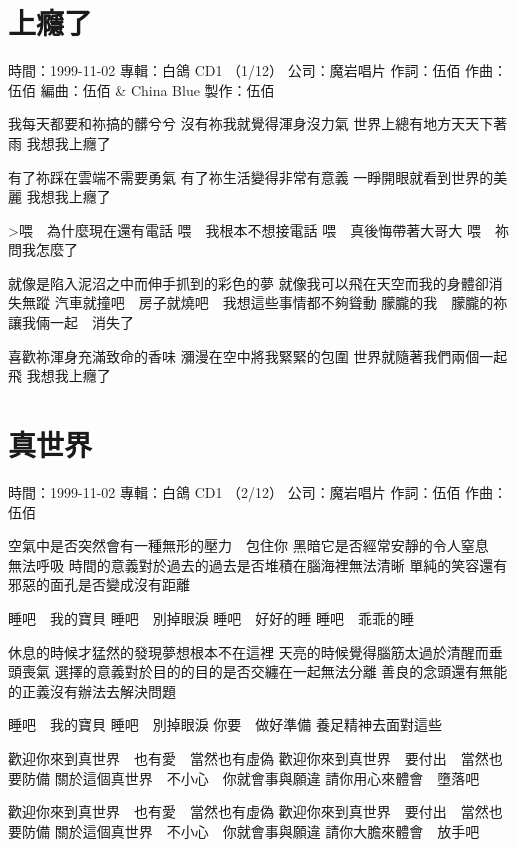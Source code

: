 \documentclass[UTF8,a4paper,oneside,twocolumn,12pt]{ctexbook}
\newcommand{\infopair}[2]{\textbullet #1：#2}
\newcommand{\zc}[1][伍佰]{\infopair{作詞}{#1}}
\newcommand{\zq}[1][伍佰]{\infopair{作曲}{#1}}
\newcommand{\bq}[1][伍佰]{\infopair{編曲}{#1}}
\newcommand{\zj}[1]{\infopair{專輯}{#1}}
\newcommand{\zz}[1]{\infopair{製作}{#1}}
\newcommand{\sj}[1]{\infopair{時間}{#1}}
\newcommand{\gs}[1]{\infopair{公司}{#1}}
\newenvironment{info}{\begin{flushleft}\kaishu
	}
	{\end{flushleft}\normalsize\yahei\par}
\newenvironment{lyric}{
	}
{}
\begin{document}
\section{上癮了}
\begin{info}
	\sj{1999-11-02}
	\zj{白鴿 CD1 （1/12）}
	\gs{魔岩唱片}
	\zc
	\zq
	\bq[伍佰 \& China Blue]
	\zz{伍佰}

\end{info}
\begin{lyric}
	我每天都要和祢搞的髒兮兮
	沒有祢我就覺得渾身沒力氣
	世界上總有地方天天下著雨
	我想我上癮了

	有了祢踩在雲端不需要勇氣
	有了祢生活變得非常有意義
	一睜開眼就看到世界的美麗
	我想我上癮了

	>喂　為什麼現在還有電話
	喂　我根本不想接電話
	喂　真後悔帶著大哥大
	喂　祢問我怎麼了

	就像是陷入泥沼之中而伸手抓到的彩色的夢
	就像我可以飛在天空而我的身體卻消失無蹤
	汽車就撞吧　房子就燒吧　我想這些事情都不夠聳動
	朦朧的我　朦朧的祢　讓我倆一起　消失了

	喜歡祢渾身充滿致命的香味
	瀰漫在空中將我緊緊的包圍
	世界就隨著我們兩個一起飛
	我想我上癮了
\end{lyric}

\section{真世界}
\begin{info}
	\sj{1999-11-02}
	\zj{白鴿 CD1 （2/12）}
	\gs{魔岩唱片}
	\zc
	\zq
\end{info}
\begin{lyric}
	空氣中是否突然會有一種無形的壓力　包住你
	黑暗它是否經常安靜的令人窒息　無法呼吸
	時間的意義對於過去的過去是否堆積在腦海裡無法清晰
	單純的笑容還有邪惡的面孔是否變成沒有距離

	睡吧　我的寶貝
	睡吧　別掉眼淚
	睡吧　好好的睡
	睡吧　乖乖的睡

	休息的時候才猛然的發現夢想根本不在這裡
	天亮的時候覺得腦筋太過於清醒而垂頭喪氣
	選擇的意義對於目的的目的是否交纏在一起無法分離
	善良的念頭還有無能的正義沒有辦法去解決問題

	睡吧　我的寶貝
	睡吧　別掉眼淚
	你要　做好準備
	養足精神去面對這些

	歡迎你來到真世界　也有愛　當然也有虛偽
	歡迎你來到真世界　要付出　當然也要防備
	關於這個真世界　不小心　你就會事與願違
	請你用心來體會　墮落吧

	歡迎你來到真世界　也有愛　當然也有虛偽
	歡迎你來到真世界　要付出　當然也要防備
	關於這個真世界　不小心　你就會事與願違
	請你大膽來體會　放手吧
\end{lyric}
\end{document}
